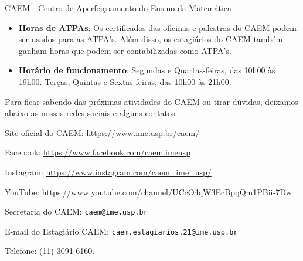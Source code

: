 \begin{secao}{CAEM - Centro de Aperfeiçoamento do Ensino da Matemática}
\begin{itemize}
\item \textbf{Horas de ATPAs}: Os certificados das oficinas e palestras
do CAEM podem ser usados para as ATPA's. Além disso, os estagiários do
CAEM também ganham horas que podem ser contabilizadas como ATPA's.

\item \textbf{Horário de funcionamento}: Segundas e Quartas-feiras,
  das 10h00 às 19h00. Terças, Quintas e Sextas-feiras, das 10h00 às
  21h00.
  
\end{itemize}

Para ficar sabendo das próximas atividades do CAEM ou tirar dúvidas,
deixamos abaixo as nossas redes sociais e alguns contatos:

Site oficial do CAEM: \url{https://www.ime.usp.br/caem/}

Facebook: \url{https://www.facebook.com/caem.imeusp}

Instagram: \url{https://www.instagram.com/caem_ime_usp/}

YouTube: \url{https://www.youtube.com/channel/UCcO4qW3EcBpqQm1PBii-7Dw}

Secretaria do CAEM: \texttt{caem@ime.usp.br}

E-mail do Estagiário CAEM: \texttt{caem.estagiarios.21@ime.usp.br}

Telefone: (11) 3091-6160.

\end{secao}
